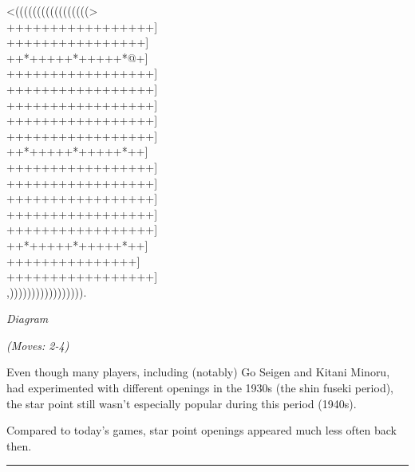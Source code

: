 \documentclass[letterpaper,12pt]{memoir}
\newcounter{GoFigure}[part]
\newcommand{\gofigure}{%
 \stepcounter{GoFigure}
 \centerline{\textit{Diagram \arabic{GoFigure}}}
}
\newcommand{\subtext}[1]{\centerline{\textit{#1}}}
\begin{document}
\begin{minipage}[t]{240pt}
\label{Fujisawa-Hosai-vs-Go-Seigen-19430225:0:mainmove-2}
{\gnos
<(((((((((((((((((>\\
+++++++++++++++++]\\
++++++++++++++++]\\
++*+++++*+++++*@+]\\
+++++++++++++++++]\\
+++++++++++++++++]\\
+++++++++++++++++]\\
+++++++++++++++++]\\
+++++++++++++++++]\\
++*+++++*+++++*++]\\
+++++++++++++++++]\\
+++++++++++++++++]\\
+++++++++++++++++]\\
+++++++++++++++++]\\
+++++++++++++++++]\\
++*+++++*+++++*++]\\
+++++++++++++++]\\
+++++++++++++++++]\\
,))))))))))))))))).\\
}
\gofigure
\subtext{(Moves: 2-4)}
\end{minipage}
\begin{minipage}[t]{268.19999999999993pt}
\setlength{\parskip}{0.5em}
Even though many players, including (notably) Go Seigen and Kitani Minoru, had experimented with different openings in the 1930s (the shin fuseki period), the star point still wasn't especially popular during this period (1940s).

Compared to today's games, star point openings appeared much less often back then.


\end{minipage}
\vfill

\rule{\textwidth}{0.5pt}
\end{document}
